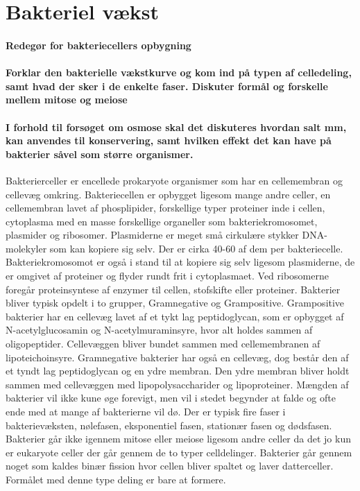 \newpage
\part{Bakteriel vækst}
\subsection*{Redegør for bakteriecellers opbygning}
\subsection*{Forklar den bakterielle vækstkurve og kom ind på typen af celledeling, samt hvad der sker i de enkelte faser. Diskuter formål og forskelle mellem mitose og meiose}
\subsection*{I forhold til forsøget om osmose skal det diskuteres hvordan salt mm, kan anvendes til konservering, samt hvilken effekt det kan have på bakterier såvel som større organismer.}
Bakterierceller er encellede prokaryote organismer som har en cellemembran og cellevæg omkring. Bakteriecellen er opbygget ligesom mange andre celler, en cellemembran lavet af phosplipider, forskellige typer proteiner inde i cellen, cytoplasma med en masse forskellige organeller som bakteriekromosomet, plasmider og ribosomer. 
Plasmiderne er meget små cirkulære stykker DNA-molekyler som kan kopiere sig selv. Der er cirka 40-60 af dem per bakteriecelle. Bakteriekromosomot er også i stand til at kopiere sig selv ligesom plasmiderne, de er omgivet af proteiner og flyder rundt frit i cytoplasmaet. Ved ribosomerne foregår proteinsyntese af enzymer til cellen, stofskifte eller proteiner. 
Bakterier bliver typisk opdelt i to grupper, Gramnegative og Grampositive. Grampositive bakterier har en cellevæg lavet af et tykt lag peptidoglycan, som er opbygget af N-acetylglucosamin og N-acetylmuraminsyre, hvor alt holdes sammen af oligopeptider. Cellevæggen bliver bundet sammen med cellemembranen af lipoteichoinsyre. Gramnegative bakterier har også en cellevæg, dog består den af et tyndt lag peptidoglycan og en ydre membran. Den ydre membran bliver holdt sammen med cellevæggen med lipopolysaccharider og lipoproteiner.
Mængden af bakterier vil ikke kune øge forevigt, men vil i stedet begynder at falde og ofte ende med at mange af bakterierne vil dø. Der er typisk fire faser i bakterievæksten, nølefasen, eksponentiel fasen, stationær fasen og dødsfasen. Bakterier går ikke igennem mitose eller meiose ligesom andre celler da det jo kun er eukaryote celler der går gennem de to typer celldelinger. Bakterier går gennem noget som kaldes binær fission hvor cellen bliver spaltet og laver datterceller. Formålet med denne type deling er bare at formere.

